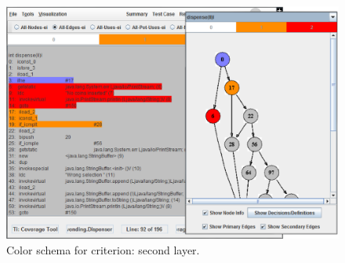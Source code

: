 
\begin{figure}[!ht]
\begin{center}
\includegraphics[height=0.40\textheight]{fig/decision-layer2.eps}
\caption{\label{fig:decision-color2} Color schema for
 criterion: second layer.}
\end{center}
\end{figure}
